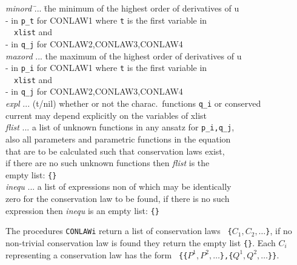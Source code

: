 \documentclass[12pt]{article}
\begin{document}
\begin{tabbing}
\hspace{0.5cm}
     {\it minord} \= ... \= the minimum of the highest order of
                          derivatives of u \\
             \> \>        - in {\tt p\_t} for CONLAW1 where {\tt t} is the first variable in\\
             \> \>        \ \  {\tt xlist} and \\
             \> \>        - in {\tt q\_j} for CONLAW2,CONLAW3,CONLAW4  \\
\hspace{0.5cm}
     {\it maxord} \> ... \> the maximum of the highest order of 
                          derivatives of u \\
             \> \>        - in {\tt p\_i} for CONLAW1 where {\tt t} is the first variable in\\
             \> \>        \ \  {\tt xlist} and  \\
             \> \>        - in {\tt q\_j} for CONLAW2,CONLAW3,CONLAW4 \\
\hspace{0.5cm}
     {\it expl}       \> ... \> (t/nil) whether or not the charac.\ 
                          functions {\tt q\_i} or conserved \\
             \> \>        current may depend explicitly on
                          the variables of xlist \\
\hspace{0.5cm}
     {\it flist}      \> ... \> a list of unknown functions in any ansatz for
                          {\tt p\_i,q\_j}, \\
        \>  \>            also all parameters and parametric functions in
                          the equation \\
        \>  \>            that are to be calculated such that
                          conservation laws exist,\\
        \>  \>            if there are no such unknown functions then
                          {\it flist} is the \\
        \>  \>            empty list: \verb+{}+ \\
\hspace{0.5cm}
     {\it inequ}      \> ... \> a list of expressions non of which
                          may be identically \\ 
        \>  \>            zero for the conservation
                          law to be found, if there is no such \\
        \>  \>            expression
                          then {\it inequ} is an empty list: \verb+{}+
\end{tabbing}
The procedures {\tt CONLAWi} return a list of conservation laws
\verb+ {+$C_1,C_2,\ldots$\verb+}+, if no
non-trivial conservation law is found they return the empty list \verb+{}+.
Each $C_i$ representing a conservation law
has the form  \verb+ {{+$P^1,P^2,\ldots$\verb+},{+$Q^1,Q^2,\ldots$\verb+}}+.
\end{document}
